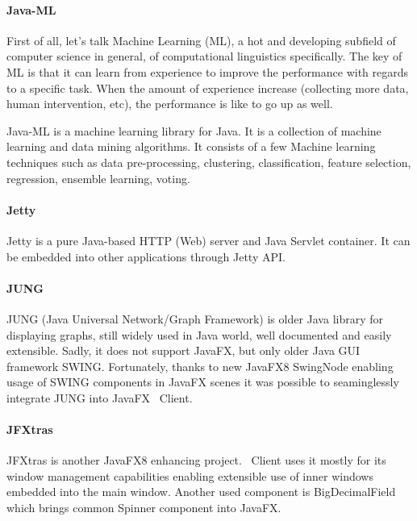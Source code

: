 \paragraph{Java-ML}

First of all, let's talk Machine Learning (ML), a hot and developing subfield of computer
science in general, of computational linguistics specifically. The key of ML is 
that it can learn from experience to improve the performance with regards to a 
specific task. When the amount of experience increase (collecting more data, human
intervention, etc), the performance is like to go up as well. 

Java-ML is a machine learning library for Java. It is a collection of machine
learning and data mining algorithms. It consists of a few Machine learning 
techniques such as data pre-processing, clustering, classification, feature 
selection, regression, ensemble learning, voting. 

\paragraph{Jetty}
Jetty is a pure Java-based HTTP (Web) server and Java Servlet container. It can
be embedded into other applications through Jetty API.

\paragraph{JUNG}
JUNG (Java Universal Network/Graph Framework) is older Java library for
displaying graphs, still widely used in Java world, well documented and easily
extensible. Sadly, it does not support JavaFX, but only older Java GUI framework
SWING. Fortunately, thanks to new JavaFX8 SwingNode enabling usage of SWING
components in JavaFX scenes it was possible to seaminglessly integrate JUNG into
JavaFX \textan\ Client.

\paragraph{JFXtras}
JFXtras is another JavaFX8 enhancing project. \textan\ Client uses it mostly for
its window management capabilities enabling extensible use of inner windows
embedded into the main window. Another used component is BigDecimalField which
brings common Spinner component into JavaFX.

